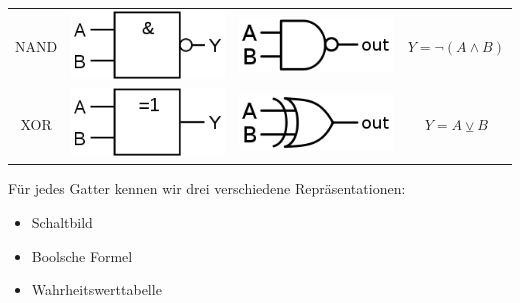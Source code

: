 \documentclass{report}
\begin{document}
\begin{center}
\begin{tabular}{c c c c}
NAND & \includegraphics[scale=0.2]{img/gatter_IEC_NAND.png} & \includegraphics[scale=0.2]{img/gatter_ANSI_NAND.png} &  $Y = \lnot (A \land B)$ \\
XOR & \includegraphics[scale=0.2]{img/gatter_IEC_XOR.png} & \includegraphics[scale=0.2]{img/gatter_ANSI_XOR.png} &  $Y = A \veebar B$
\end{tabular}\end{center}
Für jedes Gatter kennen wir drei verschiedene Repräsentationen:
\begin{itemize}
\item Schaltbild
\item Boolsche Formel
\item Wahrheitswerttabelle
\end{itemize}
\end{document}

